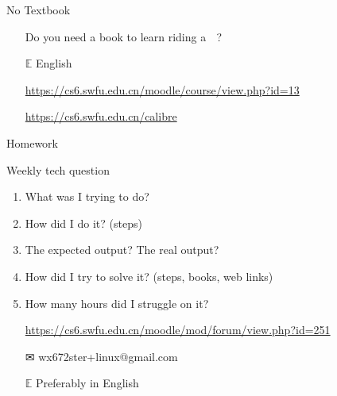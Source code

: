 \begin{frame}{No Textbook}%
  \begin{itemize}
  \item[\nerd{}] Do you need a book to learn riding a\hspace{.5ex} {\LARGE\nerd \;} ?%
  \item[{\GG}]\google
  \item[$\mathbb{E}$] {\purisa English}
  \item[\moodle] \url{https://cs6.swfu.edu.cn/moodle/course/view.php?id=13}
  \item[{\small\openbook\;}] \url{https://cs6.swfu.edu.cn/calibre}
  \end{itemize}
\end{frame}

\begin{frame}{Homework}
  \begin{block}{Weekly tech question}
    \begin{enumerate}
    \item What was I trying to do?
    \item How did I do it? (steps)
    \item The expected output? The real output?
    \item How did I try to solve it? (steps, books, web links)
    \item How many hours did I struggle on it?
    \end{enumerate}
  \end{block}
  \begin{itemize}
  \item[\moodle]
    \url{https://cs6.swfu.edu.cn/moodle/mod/forum/view.php?id=251}
  \item[\Large\dejavu ✉] \alert{\ttfamily wx672ster+linux@gmail.com}
  \item[$\mathbb{E}$] Preferably in English
  \end{itemize}
\end{frame}

